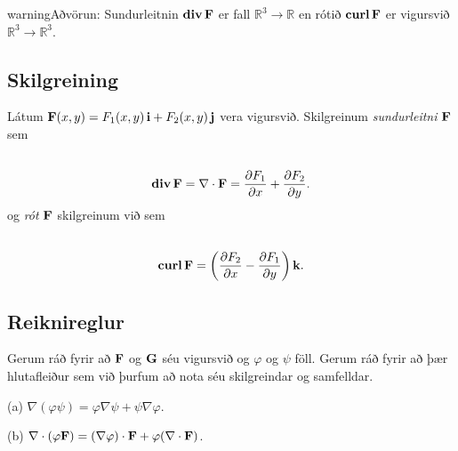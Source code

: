 \documentclass[a4paper,10pt,icelandic]{sphinxmanual}
\begin{document}
\begin{notice}{warning}{Aðvörun:}
Sundurleitnin \(\mbox{${\rm\bf div\,}$}\mbox{${\bf F}$}\) er fall \({\mathbb  R}^3\rightarrow{\mathbb  R}\) en rótið \(\mbox{${\rm\bf curl\,}$}\mbox{${\bf F}$}\) er vigursvið \({\mathbb  R}^3\rightarrow{\mathbb  R}^3\).
\end{notice}


\subsection{Skilgreining}
\label{Kafli6:id2}
Látum
\(\mbox{${\bf F}$}(x,y)=F_1(x,y)\,\mbox{${\bf i}$}+F_2(x,y)\,\mbox{${\bf j}$}\)
vera vigursvið. Skilgreinum \textit{sundurleitni} \(\mbox{${\bf F}$}\) sem
\begin{gather}
\begin{split}\displaystyle\end{split}\notag\\\begin{split}\mbox{${\rm\bf div\,}$}\mbox{${\bf F}$}=\nabla\cdot\mbox{${\bf F}$}=\frac{\partial F_1}{\partial
  x}+\frac{\partial F_2}{\partial y}.\end{split}\notag
\end{gather}
og \textit{rót} \(\mbox{${\bf F}$}\) skilgreinum við sem
\begin{gather}
\begin{split}\displaystyle\end{split}\notag\\\begin{split}\mbox{${\rm\bf curl\,}$}\mbox{${\bf F}$}=\bigg(\frac{\partial F_2}{\partial x}-\frac{\partial
  F_1}{\partial y}\bigg)\,\mbox{${\bf k}$}.\end{split}\notag
\end{gather}

\subsection{Reiknireglur}
\label{Kafli6:reiknireglur}
Gerum ráð fyrir að \(\mbox{${\bf F}$}\) og \(\mbox{${\bf G}$}\)
séu vigursvið og \(\varphi\) og \(\psi\) föll. Gerum ráð fyrir
að þær hlutafleiður sem við þurfum að nota séu skilgreindar og
samfelldar.

(a)
\(\nabla(\varphi\psi)=\varphi\nabla\psi+\psi\nabla\varphi\).

(b)
\(\nabla\cdot(\varphi\mbox{${\bf F}$})=(\nabla\varphi)\cdot\mbox{${\bf F}$}+\varphi(\nabla\cdot\mbox{${\bf F}$})\).
\end{document}
